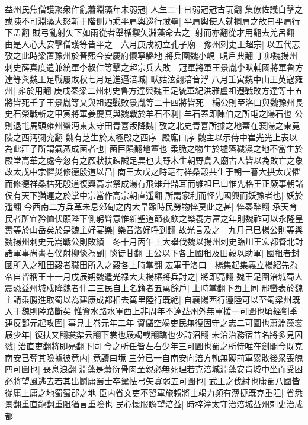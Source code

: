 益州民焦僧護聚衆作亂蕭淵藻年未弱冠|{
	人生二十曰弱冠冠古玩翻}
集僚佐議自擊之或陳不可淵藻大怒斬于階側乃乘平肩輿巡行賊壘|{
	平肩輿使人就掆肩之故曰平肩行下孟翻}
賊弓亂射矢下如雨從者舉楯禦矢淵藻命去之|{
	射而亦翻從才用翻去羌呂翻}
由是人心大安擊僧護等皆平之　六月庚戌初立孔子廟　豫州刺史王超宗|{
	以五代志攷之此時梁置豫州於晉熙今安慶府懷寧縣地}
將兵圍魏小峴|{
	峴戶典翻}
丁卯魏揚州刺史薛真度遣兼統軍李叔仁等擊之超宗兵大敗　冠軍將軍王景胤李畎輔國將軍魯方達等與魏王足戰屢敗秋七月足進逼涪城|{
	畎姑泫翻涪音浮}
八月壬寅魏中山王英寇雍州|{
	雍於用翻}
庚戌秦梁二州刺史魯方達與魏王足統軍紀洪雅盧祖遷戰敗方達等十五將皆死壬子王景胤等又與祖遷戰敗景胤等二十四將皆死　楊公則至洛口與魏豫州長史石榮戰斬之甲寅將軍姜慶真與魏戰於羊石不利|{
	羊石蓋即陳伯之所屯之陽石也}
公則退屯馬頭雍州蠻沔東太守田青喜叛降魏|{
	攷之北史青喜所據之地蓋在襄陽之東竟陵之西沔彌兖翻}
魏有芝生於太極殿之西序|{
	殿廡曰序}
魏主以示侍中崔光光上表以為此莊子所謂氣蒸成菌者也|{
	菌巨隕翻地簟也}
柔脆之物生於墟落穢濕之地不當生於殿堂高華之處今忽有之厥狀扶疎誠足異也夫野木生朝野鳥入廟古人皆以為敗亡之象故太戊中宗懼災修德殷道以昌|{
	商王太戊之時亳有祥桑榖共生于朝一暮大拱太戊懼而修德祥桑枯死殷道復興高宗祭成湯有飛雉升鼎耳而雊祖巳曰惟先格王正厥事朝諸侯有天下猶運之於掌中宗當作高宗朝直遥翻}
所謂家利而怪先國興而妖豫者也|{
	妖於遥翻}
今西南二方兵革未息郊甸之内大旱踰時民勞物悴莫此之甚|{
	悴秦醉翻}
承天育民者所宜矜恤伏願陛下側躬聳意惟新聖道節夜飲之樂養方富之年則魏祚可以永隆皇夀等於山岳矣於是魏主好宴樂|{
	樂音洛好呼到翻}
故光言及之　九月己巳楊公則等與魏揚州刺史元嵩戰公則敗績　冬十月丙午上大舉伐魏以揚州刺史臨川王宏都督北討諸軍事尚書右僕射柳惔為副|{
	惔徒甘翻}
王公以下各上國租及田穀以助軍|{
	國租者封國所入之租田穀者職田所入之穀各上時掌翻}
宏軍于洛口　楊集起集義立楊紹先為帝自皆稱王十一月戊辰朔魏遣光禄大夫楊椿將兵討之|{
	將即亮翻}
魏王足圍涪城蜀人震恐益州城戍降魏者什二三民自上名籍者五萬餘戶|{
	上時掌翻下西上同}
邢巒表於魏主請乘勝進取蜀以為建康成都相去萬里陸行既絶|{
	自襄陽西行遵陸可以至蜀梁州既入于魏則陸路斷矣}
惟資水路水軍西上非周年不達益州外無軍援一可圖也頃經劉季連反鄧元起攻圍|{
	事見上卷元年二年}
資儲空竭吏民無復固守之志二可圖也蕭淵藻裠屐少年|{
	復扶又翻裠渠云翻下裳也屐竭戟翻蹻也少詩沼翻}
未洽治務宿昔名將多見囚戮|{
	治直吏翻將即亮翻下同}
今之所任皆左右少年三可圖也蜀之所恃唯在劍閣今既克南安已奪其險據彼竟内|{
	竟讀曰境}
三分已一自南安向涪方軌無礙前軍累敗後衆喪魄四可圖也|{
	喪息浪翻}
淵藻是蕭衍骨肉至親必無死理若克涪城淵藻安肯城中坐而受困必將望風逃去若其出鬭庸蜀士卒駑怯弓矢寡弱五可圖也|{
	武王之伐紂也庸蜀八國皆從庸上庸之地蜀蜀郡之地}
臣内省文吏不習軍旅賴將士竭力頻有薄捷既克重阻|{
	省悉景翻重直龍翻重阻猶言重險也}
民心懷服瞻望涪益|{
	時梓潼太守治涪城益州刺史治成都}
